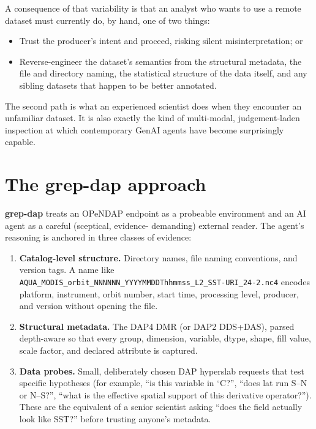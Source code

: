 \documentclass[11pt]{article}
\begin{document}
A consequence of that variability is that an analyst who wants to
use a remote dataset must currently do, by hand, one of two
things:
\begin{itemize}[topsep=2pt]
  \item Trust the producer's intent and proceed, risking silent
    misinterpretation; or
  \item Reverse-engineer the dataset's semantics from the
    structural metadata, the file and directory naming, the
    statistical structure of the data itself, and any sibling
    datasets that happen to be better annotated.
\end{itemize}
The second path is what an experienced scientist does when they
encounter an unfamiliar dataset. It is also exactly the kind of
multi-modal, judgement-laden inspection at which contemporary
GenAI agents have become surprisingly capable.

\section{The grep-dap approach}\label{sec:approach}

\textbf{grep-dap} treats an OPeNDAP endpoint as a probeable
environment and an AI agent as a careful (sceptical, evidence-
demanding) external reader. The agent's reasoning is anchored
in three classes of evidence:

\begin{enumerate}[leftmargin=2em,topsep=2pt]
  \item \textbf{Catalog-level structure.} Directory names, file
    naming conventions, and version tags. A name like
    \texttt{AQUA\_MODIS\_orbit\_NNNNNN\_YYYYMMDDThhmmss\_L2\_SST-URI\_24-2.nc4}
    encodes platform, instrument, orbit number, start time,
    processing level, producer, and version without opening the
    file.
  \item \textbf{Structural metadata.} The DAP4 DMR (or DAP2
    DDS+DAS), parsed depth-aware so that every group, dimension,
    variable, dtype, shape, fill value, scale factor, and
    declared attribute is captured.
  \item \textbf{Data probes.} Small, deliberately chosen DAP
    hyperslab requests that test specific hypotheses (for example,
    ``is this variable in $^\circ$C?'', ``does lat run S--N or
    N--S?'', ``what is the effective spatial support of this
    derivative operator?''). These are the equivalent of a
    senior scientist asking ``does the field actually look like
    SST?'' before trusting anyone's metadata.
\end{enumerate}
\end{document}

